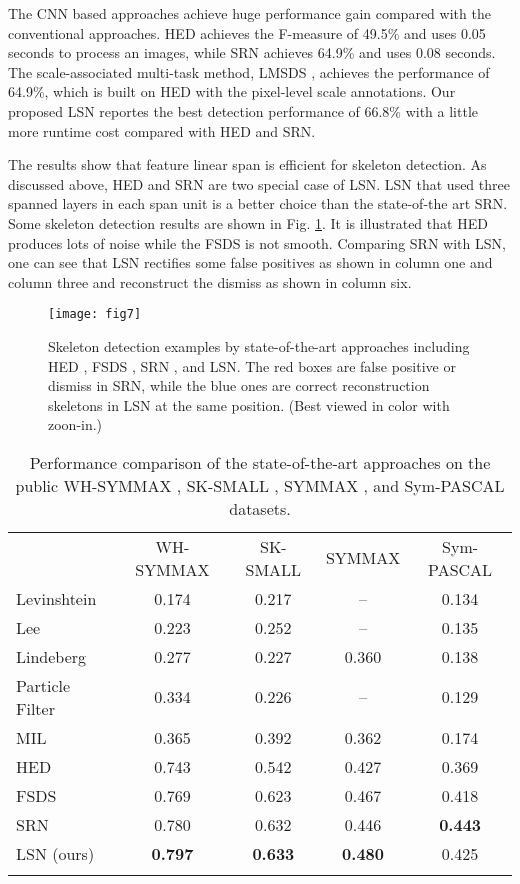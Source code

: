 \documentclass[runningheads]{llncs}
\begin{document}
The CNN based approaches achieve huge performance gain compared with the conventional approaches. HED \cite{ref6} achieves the F-measure of 49.5\% and uses  0.05 seconds to process an images, while SRN \cite{ref1} achieves 64.9\% and uses 0.08 seconds. The scale-associated multi-task method, LMSDS \cite{ref33}, achieves the performance of 64.9\%, which is built on HED with the pixel-level scale annotations. Our proposed LSN reportes the best detection performance of 66.8\% with a little more runtime cost compared with HED and SRN. 

The results show that feature linear span is efficient for skeleton detection. As discussed above, HED and SRN are two special case of LSN. LSN that used three spanned layers in each span unit is a better choice than the state-of-the art SRN. Some skeleton detection results are shown in Fig. \ref{fig::skeleton_examples}. It is illustrated that HED produces lots of noise while the FSDS is not smooth. Comparing SRN with LSN, one can see that LSN rectifies some false positives as shown in column one and column three and reconstruct the dismiss as shown in column six. 
\begin{figure}[h]
\centering
\texttt{[image: fig7]}
\caption{Skeleton detection examples by state-of-the-art approaches including HED \cite{ref6}, FSDS \cite{ref7}, SRN \cite{ref1}, and LSN. The red boxes are false positive or dismiss in SRN, while the blue ones are correct reconstruction skeletons in LSN at the same position. (Best viewed in color with zoon-in.)}
\label{fig::skeleton_examples}
\end{figure}
\setlength{\tabcolsep}{4pt}
\begin{table}
\begin{center}
\caption{Performance comparison  of the state-of-the-art approaches on the public WH-SYMMAX \cite{ref17}, SK-SMALL \cite{ref7}, SYMMAX \cite{ref15}, and Sym-PASCAL \cite{ref1} datasets.}
\begin{tabular}{lcccc}
\hline\noalign{\smallskip}
 & WH-SYMMAX  &SK-SMALL  &	SYMMAX  &	Sym-PASCAL \\
\noalign{\smallskip}
\hline
\noalign{\smallskip}
Levinshtein \cite{ref12} &	0.174 &	0.217 &	-- &	0.134 \\
Lee \cite{ref13} &	0.223 &	0.252 &	-- &	0.135 \\
Lindeberg \cite{ref37} &	0.277 &	0.227 &	0.360 &	0.138 \\
Particle Filter \cite{ref14} &	0.334 &	0.226 &	-- &	0.129 \\
MIL \cite{ref15} &	0.365 &	0.392 &	0.362 &	0.174 \\
\hline
HED \cite{ref6} &	0.743 &	0.542 &	0.427 &	0.369 \\
FSDS \cite{ref7} &	0.769 &	0.623 &	0.467 &	0.418 \\
SRN \cite{ref1} &	0.780 &	0.632 &	0.446 &	\textbf{0.443} \\
LSN (ours) &	\textbf{0.797} &	\textbf{0.633} &	\textbf{0.480} &	0.425 \\
\hline
\label{tab::four_datasets}
\end{tabular}
\end{center}
\end{table}
\end{document}
